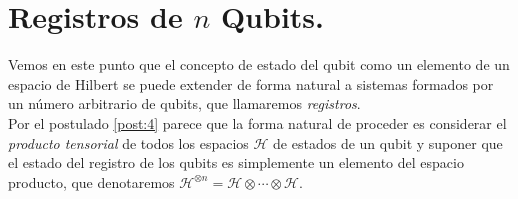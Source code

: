\documentclass[11pt, spanish]{report}
\numberwithin{equation}{section}
\numberwithin{defin}{section}
\begin{document}
%
%

%
%
%

\section{Registros de \texorpdfstring{$n$}{n} Qubits.} \label{regNQubits} 

Vemos en este punto que el concepto de estado del qubit como un elemento de un espacio de Hilbert se puede extender de forma natural a sistemas formados por un número arbitrario de qubits, que llamaremos \emph{registros}.\\

Por el postulado \ref{post:4} parece que la forma natural de proceder es considerar el \emph{producto tensorial} de todos los espacios $\mathcal{H}$ de estados de un qubit y suponer que el estado del registro de los qubits es simplemente un elemento del espacio producto, que denotaremos $\mathcal{H}^{\otimes n}=\mathcal{H}\otimes\cdots\otimes \mathcal{H}$.\\
\end{document}
